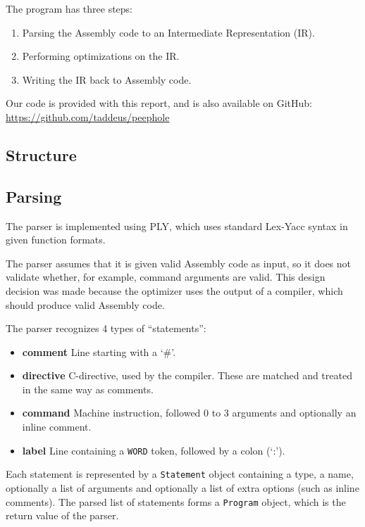 \documentclass[10pt,a4paper]{article}
\begin{document}
The program has three steps:
\begin{enumerate}
    \item Parsing the Assembly code to an Intermediate Representation (IR).
    \item Performing optimizations on the IR.
    \item Writing the IR back to Assembly code.
\end{enumerate}

Our code is provided with this report, and is also available on GitHub: \\
\url{https://github.com/taddeus/peephole}

\subsection{Structure}


\subsection{Parsing}

The parser is implemented using PLY, which uses standard Lex-Yacc syntax in
given function formats.

The parser assumes that it is given valid Assembly code as input, so it does
not validate whether, for example, command arguments are valid. This design
decision was made because the optimizer uses the output of a compiler, which
should produce valid Assembly code.

The parser recognizes 4 types of ``statements'':
\begin{itemize}
    \item \textbf{comment} Line starting with a `\#'.
    \item \textbf{directive} C-directive, used by the compiler. These are
                             matched and treated in the same way as comments.
    \item \textbf{command} Machine instruction, followed 0 to 3 arguments and
                           optionally an inline comment.
    \item \textbf{label} Line containing a \texttt{WORD} token, followed by a
                         colon (`:').
\end{itemize}

Each statement is represented by a \texttt{Statement} object containing a type,
a name, optionally a list of arguments and optionally a list of extra options
(such as inline comments). The parsed list of statements forms a
\texttt{Program} object, which is the return value of the parser.
\end{document}

